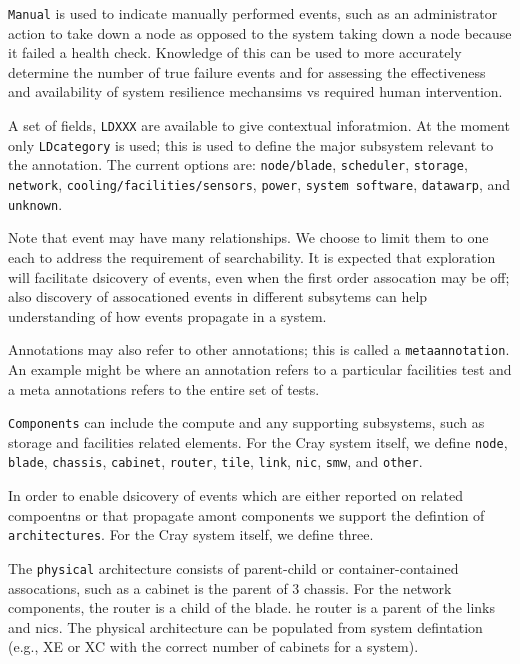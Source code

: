 \texttt{Manual} is used to indicate manually performed
events, such as an administrator action to take down a node as opposed
to the system taking down a node because it failed a health check.
Knowledge of this can be used to more accurately determine the
number of true failure events and for assessing the effectiveness
and availability of system resilience mechansims vs required
human intervention.

A set of fields, \texttt{LDXXX} are available to give contextual inforatmion.
At the moment only \texttt{LDcategory} is used; this is used to define the major
subsystem relevant to the annotation. The current options are: \texttt{node/blade},
\texttt{scheduler}, \texttt{storage}, \texttt{network}, \texttt{cooling/facilities/sensors},
\texttt{power}, \texttt{system software}, \texttt{datawarp}, and \texttt{unknown}.

Note that event may have many relationships. We choose to limit them to one each to address
the requirement of searchability. It is expected that exploration will facilitate dsicovery
of events, even when the first order assocation may be off; also discovery of assocationed
events in different subsytems can help understanding of how events propagate in a system.

Annotations may also refer to other annotations; this is called a \texttt{metaannotation}.
An example might be where an annotation refers to a particular facilities
test and a meta annotations refers to the entire set of tests.

\texttt{Components} can include the compute and any supporting subsystems,
such as storage and facilities related elements. For the Cray system
itself, we define \texttt{node}, \texttt{blade}, \texttt{chassis},
\texttt{cabinet}, \texttt{router}, \texttt{tile}, \texttt{link}, \texttt{nic},
\texttt{smw}, and \texttt{other}.

In order to enable dsicovery of events which are either reported on related
compoentns or that propagate amont components we support the defintion
of \texttt{architectures}. For the Cray system itself, we define three.

The \texttt{physical} architecture consists of parent-child or
container-contained assocations, such as a cabinet is the parent of
3 chassis. For the network components, the router is a child of the blade.
he router is a parent of the links and nics. The physical architecture
can be populated from system defintation (e.g., XE or XC with the
correct number of cabinets for a system).

